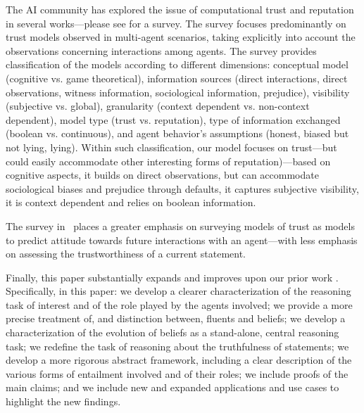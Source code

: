\documentclass{article}
\begin{document}
The AI community has explored the issue of computational trust and reputation in several works---please see \cite{SabaterS05} for a survey. The survey focuses predominantly on trust models observed in multi-agent scenarios, taking explicitly into account the observations concerning interactions among agents. The survey provides classification of the models according to different dimensions: conceptual model (cognitive vs. game theoretical), information sources (direct interactions, direct observations, witness information, sociological information, prejudice), visibility (subjective vs. global), granularity (context dependent vs. non-context dependent), model type (trust vs. reputation), type of information exchanged (boolean vs. continuous), and agent behavior's assumptions (honest, biased but not lying, lying). Within such classification, our model focuses on trust---but could easily accommodate other interesting forms of reputation)---based on cognitive aspects, it builds on direct observations, but can accommodate sociological biases and prejudice through defaults, it captures subjective visibility, it is context dependent and relies on boolean information.
 
The survey in~\cite{ArtzG07} places a greater emphasis on surveying models of trust as models to predict attitude towards future interactions with an agent---with less emphasis on assessing the trustworthiness of a current statement.  

Finally, this paper substantially expands and improves upon our prior work \cite{spg16,spg16b}. Specifically, in this paper:
we develop a clearer characterization of the reasoning task of interest and of the role played by the agents involved;
we provide a more precise treatment of, and distinction between, fluents and beliefs;
we develop a characterization of the evolution of beliefs as a stand-alone, central reasoning task;
we redefine the task of reasoning about the truthfulness of statements;
we develop a more rigorous abstract framework, including a clear description of the various forms of entailment involved and of their roles;
we include proofs of the main claims; and
we include new and expanded applications and use cases to highlight the new findings.
\end{document}
